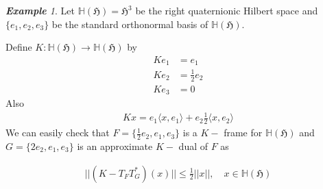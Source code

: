 \documentclass[a4paper,12pt,reqno]{amsart}
\theoremstyle{plain}
\theoremstyle{remark}
\newtheorem{example}[theorem]{\bf Example}
\begin{document}
	
	
	\begin{example}
		Let $\mathbb{H}(\mathfrak{H})=\mathfrak{H}^3$ be the right quaternionic Hilbert space and $\{e_1, e_2, e_3\}$ be the standard orthonormal basis of $\mathbb{H}(\mathfrak{H})$. 
		
		Define $K:\mathbb{H}(\mathfrak{H})\to\mathbb{H}(\mathfrak{H})$ by 
		\begin{align*}
			Ke_1&=e_1\\
			Ke_2&=\frac{1}{2}e_2\\
			Ke_3&=0
		\end{align*}
		Also
		\begin{align*}
			Kx=e_1\langle x, e_1 \rangle  + e_2\frac{1}{2} \langle x, e_2 \rangle  
		\end{align*}
		We can easily check that $F=\{ \frac{1}{2} e_2, e_1, e_3\}$ is a $K-$ frame for $\mathbb{H}(\mathfrak{H})$ and $G=\{2e_2, e_1, e_3\}$ is an approximate $K-$ dual of $F$ as 
		
		\begin{align*}
			||(K-T_F T_G^*)(x)||\leq \frac{1}{2}||x||, \quad x\in \mathbb{H}(\mathfrak{H})
		\end{align*}
		
	\end{example}
	
\end{document}
